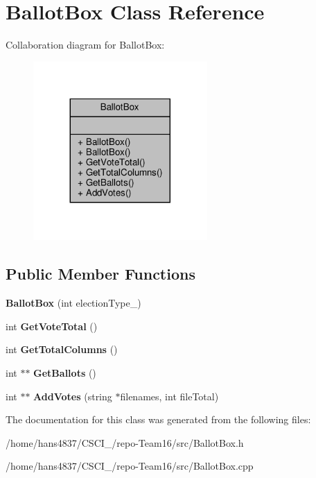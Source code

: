 \hypertarget{classBallotBox}{}\section{Ballot\+Box Class Reference}
\label{classBallotBox}


Collaboration diagram for Ballot\+Box\+:
\nopagebreak
\begin{figure}[H]
\begin{center}
\leavevmode
\includegraphics[width=188pt]{classBallotBox__coll__graph}
\end{center}
\end{figure}
\subsection*{Public Member Functions}
\begin{DoxyCompactItemize}
\item 
\mbox{\label{classBallotBox_ae1a3df998fab9d6e3d047831f9b68739}} 
{\bfseries Ballot\+Box} (int election\+Type\+\_\+)
\item 
\mbox{\label{classBallotBox_a67de3fc3194d03e45f23cb50c5d49f08}} 
int {\bfseries Get\+Vote\+Total} ()
\item 
\mbox{\label{classBallotBox_aa8a05c3bd77b31b6d1845830aff6826e}} 
int {\bfseries Get\+Total\+Columns} ()
\item 
\mbox{\label{classBallotBox_acc0a077b87fb2705e67de17b9263b629}} 
int $\ast$$\ast$ {\bfseries Get\+Ballots} ()
\item 
\mbox{\label{classBallotBox_a54b15e3c3feb53dd4578843a28d418b7}} 
int $\ast$$\ast$ {\bfseries Add\+Votes} (string $\ast$filenames, int file\+Total)
\end{DoxyCompactItemize}


The documentation for this class was generated from the following files\+:\begin{DoxyCompactItemize}
\item 
/home/hans4837/\+C\+S\+C\+I\+\_/repo-\/\+Team16/src/Ballot\+Box.\+h\item 
/home/hans4837/\+C\+S\+C\+I\+\_/repo-\/\+Team16/src/Ballot\+Box.\+cpp\end{DoxyCompactItemize}
